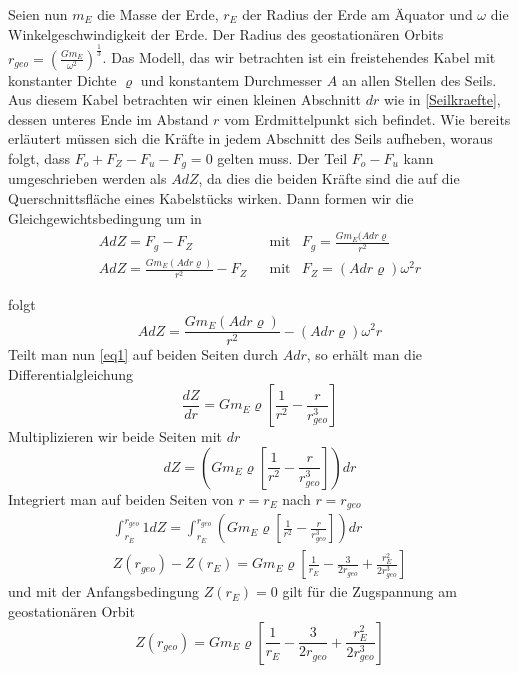 \documentclass[a4paper, 10pt]{report}
\begin{document}
Seien nun $m_E$ die Masse der Erde, $r_E$ der Radius der Erde am Äquator und $\omega$ die Winkelgeschwindigkeit der Erde. Der Radius des geostationären Orbits $r_{geo}=(\frac{Gm_E}{\omega^2})^\frac{1}{3}$.
Das Modell, das wir betrachten ist ein freistehendes Kabel mit konstanter Dichte $\varrho$ und konstantem Durchmesser $A$ an allen Stellen des Seils. Aus diesem Kabel betrachten wir einen kleinen Abschnitt $dr$ wie in \autoref{Seilkraefte}, dessen unteres Ende im Abstand $r$ vom Erdmittelpunkt sich befindet. Wie bereits erläutert müssen sich die Kräfte in jedem Abschnitt des Seils aufheben, woraus folgt, dass $F_o + F_Z - F_u - F_g = 0$ gelten muss. Der Teil $F_o - F_u$ kann umgeschrieben werden als $AdZ$, da dies die beiden Kräfte sind die auf die Querschnittsfläche eines Kabelstücks wirken. Dann formen wir die Gleichgewichtsbedingung um in
\begin{align*}
AdZ = F_g - F_Z && \text{mit}	& F_g = \frac{Gm_E(Adr\varrho}{r^2}
\\ 
AdZ = \frac{Gm_E(Adr\varrho)}{r^2} - F_Z		&& \text{mit}	& F_Z = (Adr\varrho)\omega^2r
\end{align*}

folgt
\begin{equation}
AdZ = \frac{Gm_E(Adr\varrho)}{r^2} - (Adr\varrho)\omega^2r
\end{equation}
\label{eq1}
Teilt man nun \autoref{eq1} auf beiden Seiten durch $Adr$, so erhält man die Differentialgleichung
\begin{equation}
\frac{dZ}{dr} = Gm_E\varrho[\frac{1}{r^2} - \frac{r}{r_{geo}^3}]
\end{equation}
\label{eq2}
Multiplizieren wir beide Seiten mit $dr$ 
\begin{equation*}
dZ = (Gm_E\varrho[\frac{1}{r^2} - \frac{r}{r_{geo}^3}])dr
\end{equation*}
Integriert man auf beiden Seiten von $r=r_E$ nach $r=r_{geo}$ 
\begin{align*}
\int_{r_E}^{r_{geo}}1dZ = \int_{r_E}^{r_{geo}}(Gm_E\varrho[\frac{1}{r^2} - \frac{r}{r_{geo}^3}])dr\\
Z(r_{geo}) - Z(r_E) = Gm_E\varrho[\frac{1}{r_E} - \frac{3}{2r_{geo}} + \frac{r_E^2}{2r_{geo}^3}]
\end{align*}
und mit der Anfangsbedingung $Z(r_E)=0$ gilt für die Zugspannung am geostationären Orbit
\begin{equation}
Z(r_{geo}) = Gm_E\varrho[\frac{1}{r_E} - \frac{3}{2r_{geo}} + \frac{r_E^2}{2r_{geo}^3}]
\end{equation}
\label{eq3}
\end{document}
